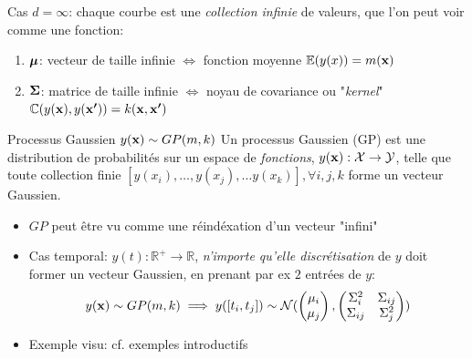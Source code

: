\documentclass[xcolor=svgnames, t]{beamer}
\newcommand{\vectorx}[1]{\boldsymbol{\MakeLowercase{\mathbf{#1}}}}
\newcommand{\matrixx}[1]{\boldsymbol{\MakeUppercase{#1}}}
\newcommand{\coloredemph}[1]{\textcolor{internationalblue}{\emph{#1}}}
\begin{document}
\begin{frame}{\subsecname}
  
  Cas $d=\infty$: chaque courbe est une \coloredemph{collection infinie} de valeurs, que l'on peut voir comme une fonction:%
  \begin{enumerate}
    \item $\vectorx{\mu}$: vecteur de taille infinie $\Leftrightarrow$ fonction moyenne $\mathbb{E}(y(x)) = m(\vectorx{x})$
    \item $\matrixx{\Sigma}$: matrice de taille infinie $\Leftrightarrow$  noyau de covariance ou "\coloredemph{kernel}"
    $\mathbb{C}( y(\vectorx{x}), y(\vectorx{x^\prime}) ) = k(\vectorx{x}, \vectorx{x^{\prime}})$
  \end{enumerate}
  \pause
  \begin{block}{Processus Gaussien $y(\vectorx{x}) \sim GP(m, k)$ \cite{Rasmussen2006}}
    Un processus Gaussien (GP) est une distribution de probabilités sur un espace de \coloredemph{fonctions},
    $y(\vectorx{x}): \mathcal{X} \to \mathcal{Y}$, telle que toute collection finie
    $[ y(x_i), \dots, y(x_j), \dots y(x_k) ], \forall i,j,k$ forme un vecteur Gaussien. 
  \end{block}
\end{frame}

\begin{frame}{\subsecname}
  \begin{itemize}
    \item $GP$ peut être vu comme une réindéxation d'un vecteur "infini"
    \pause
    \item Cas temporal: $y(t): \mathbb{R}^{+} \to \mathbb{R}$, \coloredemph{n'importe qu'elle discrétisation} de $y$ doit
    former un vecteur Gaussien, en prenant par ex $2$ entrées de $y$:
    \begin{equation*}
      y(\vectorx{x}) \sim GP(m, k) \implies
      y([t_i, t_j]) \sim \mathcal{N} (
        \begin{pmatrix}
          \mu_i \\
          \mu_j 
        \end{pmatrix},
        \begin{pmatrix}
          \Sigma_{i}^2 & \Sigma_{ij} \\
          \Sigma_{ij} & \Sigma_{j}^2
        \end{pmatrix}
        )
    \end{equation*}
    \item Exemple visu: cf. exemples introductifs
  \end{itemize}
\end{frame}
\end{document}
